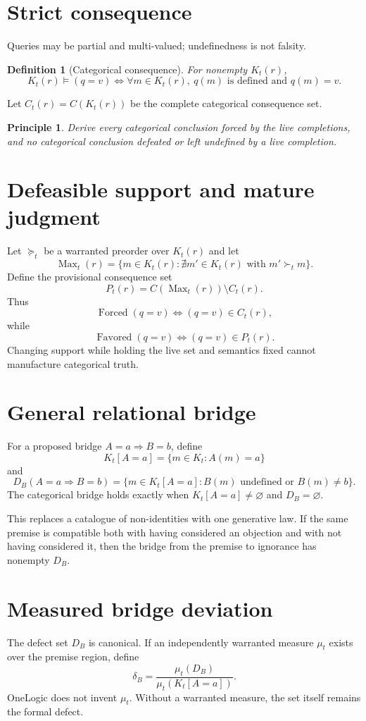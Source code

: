 \documentclass[11pt]{article}
\newtheorem{definition}{Definition}
\newtheorem{principle}{Principle}
\begin{document}
\section{Strict consequence}
Queries may be partial and multi-valued; undefinedness is not falsity.
\begin{definition}[Categorical consequence]
For nonempty $K_t(r)$,
\[
K_t(r)\models(q=v)
\Longleftrightarrow
\forall m\in K_t(r),\ q(m)\text{ is defined and }q(m)=v.
\]
\end{definition}
Let $C_t(r)=C(K_t(r))$ be the complete categorical consequence set.

\begin{principle}
Derive every categorical conclusion forced by the live completions, and no categorical conclusion defeated or left undefined by a live completion.
\end{principle}

\section{Defeasible support and mature judgment}
Let $\succeq_t$ be a warranted preorder over $K_t(r)$ and let
\[
\operatorname{Max}_t(r)=\{m\in K_t(r):\nexists m'\in K_t(r)\text{ with }m'\succ_t m\}.
\]
Define the provisional consequence set
\[
P_t(r)=C(\operatorname{Max}_t(r))\setminus C_t(r).
\]
Thus
\[
\operatorname{Forced}(q=v)\Longleftrightarrow(q=v)\in C_t(r),
\]
while
\[
\operatorname{Favored}(q=v)\Longleftrightarrow(q=v)\in P_t(r).
\]
Changing support while holding the live set and semantics fixed cannot manufacture categorical truth.

\section{General relational bridge}
For a proposed bridge $A=a\Rightarrow B=b$, define
\[
K_t[A=a]=\{m\in K_t:A(m)=a\}
\]
and
\[
D_B(A=a\Rightarrow B=b)
=\{m\in K_t[A=a]:B(m)\text{ undefined or }B(m)\neq b\}.
\]
The categorical bridge holds exactly when $K_t[A=a]\neq\varnothing$ and $D_B=\varnothing$.

This replaces a catalogue of non-identities with one generative law. If the same premise is compatible both with having considered an objection and with not having considered it, then the bridge from the premise to ignorance has nonempty $D_B$.

\section{Measured bridge deviation}
The defect set $D_B$ is canonical. If an independently warranted measure $\mu_t$ exists over the premise region, define
\[
\delta_B=\frac{\mu_t(D_B)}{\mu_t(K_t[A=a])}.
\]
OneLogic does not invent $\mu_t$. Without a warranted measure, the set itself remains the formal defect.
\end{document}
